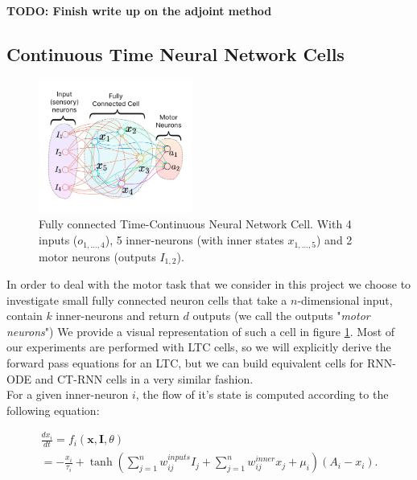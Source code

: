 \textbf{TODO: Finish write up on the adjoint method}

\subsection{Continuous Time Neural Network Cells}
\label{sec:nn_cell}

\begin{figure}[h!]
    \centering
    \includegraphics[width=0.45\textwidth]{figures/LTC_Cell.pdf}
    \caption{Fully connected Time-Continuous Neural Network Cell. With 4 inputs ($o_{1,\dots,4}$), 5 inner-neurons (with inner states $x_{1,\dots,5}$) and 2 motor neurons (outputs $I_{1,2}$).}
    \label{fig:cell_drawing}
\end{figure}

In order to deal with the motor task that we consider in this project we choose to investigate small fully connected neuron cells that take a $n$-dimensional input, contain $k$ inner-neurons and return $d$ outputs (we call the outputs "\textit{motor neurons}") We provide a visual representation of such a cell in figure \ref{fig:cell_drawing}. Most of our experiments are performed with LTC cells, so we will explicitly derive the forward pass equations for an LTC, but we can build equivalent cells for RNN-ODE and CT-RNN cells in a very similar fashion.\\

For a given inner-neuron $i$, the flow of it's state is computed according to the following equation: 

\begin{footnotesize}
    \begin{align*}
        \frac{dx_i}{dt} = f_i(\textbf{x},\textbf{I},\theta)\\
        = - \frac{x_i}{\tau_i} +
        \tanh \left( \sum_{j=1}^{n} w_{ij}^\textit{inputs} I_j +\sum_{j=1}^{n} w_{ij}^\textit{inner} x_j  +\mu_i\right) (A_i-x_i).
    \end{align*}
\end{footnotesize}

